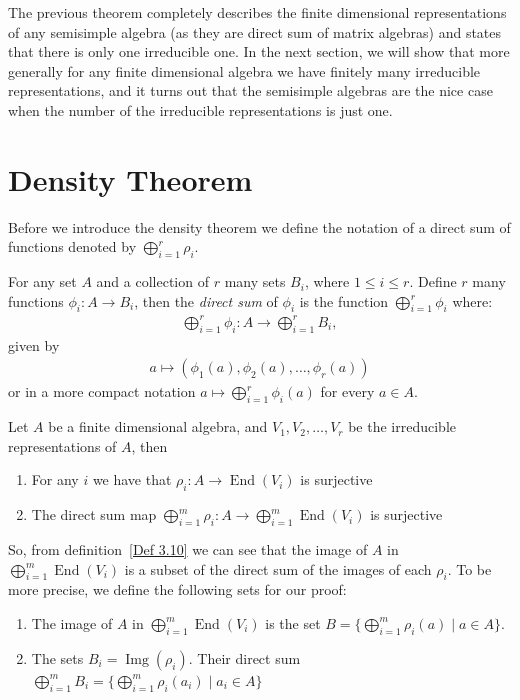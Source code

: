 The previous theorem completely describes the finite dimensional representations of any semisimple algebra (as they are direct sum of matrix algebras) and states that there is only one irreducible one. In the next section, we will show that more generally for any finite dimensional algebra we have finitely many irreducible representations, and it turns out that the semisimple algebras are the nice case when the number of the irreducible representations is just one.


\section{Density Theorem}
Before we introduce the density theorem we define the notation of a direct sum of functions denoted by $\displaystyle \bigoplus^r_{i =1} \rho_i$.
\begin{definition}\label{Def 3.10}
For any set $A$ and a collection of $r$ many sets $B_i$, where $1 \leq i \leq r$. Define $r$ many functions $\phi_i: A \to B_i$, then the \emph{direct sum} of $\phi_i$ is the function $\displaystyle \bigoplus^r_{i=1} \phi_i$ where:
\begin{align*}
    \bigoplus_{i= 1}^r \phi_i: A \to \bigoplus_{i=1}^r B_i,
\end{align*}
given by
\begin{align*}
    a \mapsto (\phi_1(a), \phi_2(a), \dots, \phi_r(a))
\end{align*}
or in a more compact notation $a \mapsto \bigoplus_{i=1}^r \phi_i(a)$ for every $a \in A$.
\end{definition}
\begin{theorem}\label{3.11}
    Let $A$ be a finite dimensional algebra, and $V_1, V_2, \dots, V_r$ be the irreducible representations of $A$, then
    \begin{enumerate}
        \item For any $i$ we have that $\rho_i: A \to \operatorname{End}(V_i)$ is surjective
        \item The direct sum map $\bigoplus_{i=1}^m \rho_i: A \to \bigoplus_{i=1}^m \operatorname{End}(V_i)$ is surjective
    \end{enumerate}
\end{theorem}
So, from definition~\ref{Def 3.10} we can see that the image of $A$ in $\bigoplus_{i=1}^m \operatorname{End}(V_i)$ is a subset of the direct sum of the images of each $\rho_i$. To be more precise, we define the following sets for our proof:
\begin{enumerate}
    \item The image of $A$ in $\bigoplus_{i=1}^m \operatorname{End}(V_i)$ is the set $B = \big \{\bigoplus_{i=1}^m \rho_i(a) \mid a \in A \big\}.$
    \item  The sets $B_i = \operatorname{Img} (\rho_i)$. Their direct sum $\bigoplus_{i=1}^m B_i = \big\{\bigoplus_{i=1}^m \rho_i(a_i) \mid a_i \in A \big\}$
\end{enumerate}
